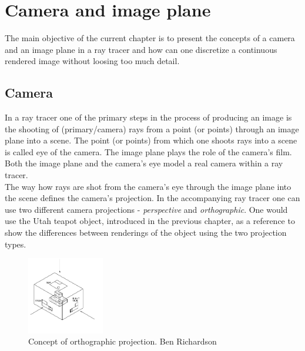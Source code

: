 \documentclass{article}
\begin{document}
\section{Camera and image plane}
\label{sec:cameras}
The main objective of the current chapter is to present the concepts of a camera and an image plane in a ray tracer and how can one discretize a continuous rendered image without loosing too much detail. 

\subsection{Camera}
In a ray tracer one of the primary steps in the process of producing an image is the shooting of (primary/camera) rays from a point (or points) through an image plane into a scene. The point (or points) from which one shoots rays into a scene is called eye of the camera. The image plane plays the role of the camera's film. Both the image plane and the camera's eye model a real camera within a ray tracer. \\
The way how rays are shot from the camera's eye through the image plane into the scene defines the camera's projection. In the accompanying ray tracer one can use two different camera projections - \textit{perspective} and \textit{orthographic}. One would use the Utah teapot object, introduced in the previous chapter, as a reference to show the differences between renderings of the object using the two projection types.

\vspace*{\baselineskip}

\begin{figure} 
    \centering
    \includegraphics[width=0.3\textwidth]{orthographic_projection}
    \caption{Concept of orthographic projection. Ben Richardson}
    \label{fig:concept_orthographic}
\end{figure}
\end{document}

